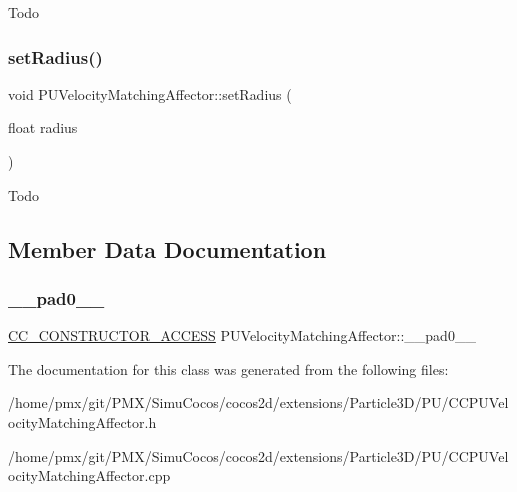 Todo \mbox{\label{classPUVelocityMatchingAffector_a860d0ddacded5b1e8d664f38cebc9bce}} 
\subsubsection{\texorpdfstring{set\+Radius()}{setRadius()}\hspace{0.1cm}{\footnotesize\ttfamily [2/2]}}
{\footnotesize\ttfamily void P\+U\+Velocity\+Matching\+Affector\+::set\+Radius (\begin{DoxyParamCaption}\item[{float}]{radius }\end{DoxyParamCaption})}

Todo 

\subsection{Member Data Documentation}
\mbox{\label{classPUVelocityMatchingAffector_aeefb7145690dc14856fce974ffecaa09}} 
\subsubsection{\texorpdfstring{\+\_\+\+\_\+pad0\+\_\+\+\_\+}{\_\_pad0\_\_}}
{\footnotesize\ttfamily \hyperlink{_2cocos2d_2cocos_2base_2ccConfig_8h_a25ef1314f97c35a2ed3d029b0ead6da0}{C\+C\+\_\+\+C\+O\+N\+S\+T\+R\+U\+C\+T\+O\+R\+\_\+\+A\+C\+C\+E\+SS} P\+U\+Velocity\+Matching\+Affector\+::\+\_\+\+\_\+pad0\+\_\+\+\_\+}







The documentation for this class was generated from the following files\+:\begin{DoxyCompactItemize}
\item 
/home/pmx/git/\+P\+M\+X/\+Simu\+Cocos/cocos2d/extensions/\+Particle3\+D/\+P\+U/C\+C\+P\+U\+Velocity\+Matching\+Affector.\+h\item 
/home/pmx/git/\+P\+M\+X/\+Simu\+Cocos/cocos2d/extensions/\+Particle3\+D/\+P\+U/C\+C\+P\+U\+Velocity\+Matching\+Affector.\+cpp\end{DoxyCompactItemize}
